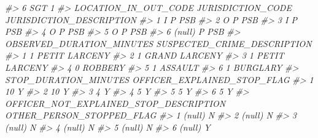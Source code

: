 \documentclass[
]{krantz}
\makeatletter
\newenvironment{Shaded}{\begin{snugshade}}{\end{snugshade}}
\newcommand{\CommentTok}[1]{\textcolor[rgb]{0.37,0.37,0.37}{\textit{#1}}}
\newenvironment{kframe}{%
\medskip{}
\setlength{\fboxsep}{.8em}
 \def\at@end@of@kframe{}%
 \ifinner\ifhmode%
  \def\at@end@of@kframe{\end{minipage}}%
  \begin{minipage}{\columnwidth}%
 \fi\fi%
 \def\FrameCommand##1{\hskip\@totalleftmargin \hskip-\fboxsep
 \colorbox{shadecolor}{##1}\hskip-\fboxsep
     \hskip-\linewidth \hskip-\@totalleftmargin \hskip\columnwidth}%
 \MakeFramed {\advance\hsize-\width
   \@totalleftmargin\z@ \linewidth\hsize
   \@setminipage}}%
 {\par\unskip\endMakeFramed%
 \at@end@of@kframe}
\renewenvironment{Shaded}{\begin{kframe}}{\end{kframe}}
\makeatother
\begin{document}
\begin{Shaded}
\begin{Highlighting}[]
\CommentTok{\#\textgreater{} 6                      SGT                                1}
\CommentTok{\#\textgreater{}   LOCATION\_IN\_OUT\_CODE JURISDICTION\_CODE JURISDICTION\_DESCRIPTION}
\CommentTok{\#\textgreater{} 1                    I                 P                      PSB}
\CommentTok{\#\textgreater{} 2                    O                 P                      PSB}
\CommentTok{\#\textgreater{} 3                    I                 P                      PSB}
\CommentTok{\#\textgreater{} 4                    O                 P                      PSB}
\CommentTok{\#\textgreater{} 5                    O                 P                      PSB}
\CommentTok{\#\textgreater{} 6               (null)                 P                      PSB}
\CommentTok{\#\textgreater{}   OBSERVED\_DURATION\_MINUTES SUSPECTED\_CRIME\_DESCRIPTION}
\CommentTok{\#\textgreater{} 1                         1               PETIT LARCENY}
\CommentTok{\#\textgreater{} 2                         1               GRAND LARCENY}
\CommentTok{\#\textgreater{} 3                         1               PETIT LARCENY}
\CommentTok{\#\textgreater{} 4                         0                     ROBBERY}
\CommentTok{\#\textgreater{} 5                         1                     ASSAULT}
\CommentTok{\#\textgreater{} 6                         1                    BURGLARY}
\CommentTok{\#\textgreater{}   STOP\_DURATION\_MINUTES OFFICER\_EXPLAINED\_STOP\_FLAG}
\CommentTok{\#\textgreater{} 1                    10                           Y}
\CommentTok{\#\textgreater{} 2                    10                           Y}
\CommentTok{\#\textgreater{} 3                     4                           Y}
\CommentTok{\#\textgreater{} 4                     5                           Y}
\CommentTok{\#\textgreater{} 5                     5                           Y}
\CommentTok{\#\textgreater{} 6                     5                           Y}
\CommentTok{\#\textgreater{}   OFFICER\_NOT\_EXPLAINED\_STOP\_DESCRIPTION OTHER\_PERSON\_STOPPED\_FLAG}
\CommentTok{\#\textgreater{} 1                                 (null)                         N}
\CommentTok{\#\textgreater{} 2                                 (null)                         N}
\CommentTok{\#\textgreater{} 3                                 (null)                         N}
\CommentTok{\#\textgreater{} 4                                 (null)                         N}
\CommentTok{\#\textgreater{} 5                                 (null)                         N}
\CommentTok{\#\textgreater{} 6                                 (null)                         Y}

\end{Highlighting}
\end{Shaded}
\end{document}

